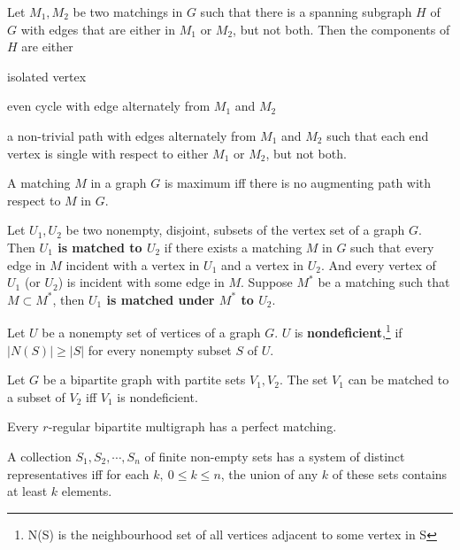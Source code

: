 \begin{theorem}
	Let $M_1,M_2$ be two matchings in $G$ such that there is a spanning subgraph $H$ of $G$ with edges that are either in $M_1$ or $M_2$, but not both. Then the components of $H$ are either \begin{enumerate*} \item isolated vertex \item even cycle with edge alternately from $M_1$ and $M_2$ \item a non-trivial path with edges alternately from $M_1$ and $M_2$ such that each end vertex is single with respect to either $M_1$ or $M_2$, but not both. \end{enumerate*}
\end{theorem}

\begin{theorem}
	A matching $M$ in a graph $G$ is maximum iff there is no augmenting path with respect to $M$ in $G$.
\end{theorem}

\begin{definition}
	Let $U_1,U_2$ be two nonempty, disjoint, subsets of the vertex set of a graph $G$. Then \textbf{$U_1$ is matched to $U_2$} if there exists a matching $M$ in $G$ such that every edge in $M$ incident with a vertex in $U_1$ and a vertex in $U_2$. And every vertex of $U_1$ (or $U_2$) is incident with some edge in $M$. Suppose $M^*$ be a matching such that $M \subset M^*$, then \textbf{$U_1$ is matched under $M^*$ to $U_2$}.
\end{definition}

\begin{definition}
	Let $U$ be a nonempty set of vertices of a graph $G$. $U$ is \textbf{nondeficient},\footnote{N(S) is the neighbourhood set of all vertices adjacent to some vertex in S} if $|N(S)| \ge |S|$ for every nonempty subset $S$ of $U$.
\end{definition}

\begin{theorem}
	Let $G$ be a bipartite graph with partite sets $V_1,V_2$. The set $V_1$ can be matched to a subset of $V_2$ iff $V_1$ is nondeficient.
\end{theorem}
\begin{corollary}
	Every $r$-regular bipartite multigraph has a perfect matching.
\end{corollary}

\begin{theorem}
	A collection $S_1,S_2,\cdots,S_n$ of finite non-empty sets has a system of distinct representatives iff for each $k,\ 0 \le k \le n$, the union of any $k$ of these sets contains at least $k$ elements.
\end{theorem}

